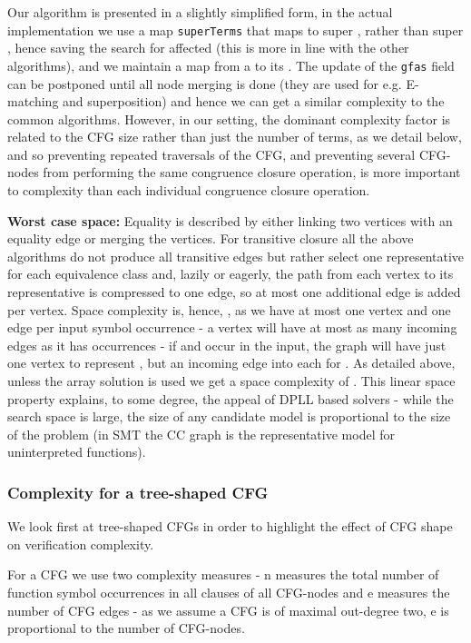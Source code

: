 Our algorithm is presented in a slightly simplified form, in the actual implementation we use a map \lstinline|superTerms| that maps to super \GFAs{}, rather than super \GTs{}, hence saving the search for affected \GFAs{} (this is more in line with the other algorithms), and we maintain a map from a \GFA{} to its \GT{}. The update of the \lstinline|gfas| field can be postponed until all node merging is done (they are used for e.g. E-matching and superposition) and hence we can get a similar complexity to the common algorithms. 
However, in our setting, the dominant complexity factor is related to the CFG size rather than just the number of terms, as we detail below, and so preventing repeated traversals of the CFG, and preventing several CFG-nodes from performing the same congruence closure operation, is more important to complexity than each individual congruence closure operation.

\textbf{Worst case space:} Equality is described by either linking two vertices with an equality edge or merging the vertices. For transitive closure all the above algorithms do not produce all transitive edges but rather select one representative for each equivalence class and, lazily or eagerly, the path from each vertex to its representative is compressed to one edge, so at most one additional edge is added per vertex.
Space complexity is, hence, , as we have at most one vertex and one edge per input symbol occurrence - a vertex will have at most as many incoming edges as it has occurrences - if  and  occur in the input, the graph will have just one vertex to represent , but an incoming edge into  each for .
As detailed above, unless the array solution is used we get a space complexity of .
This linear space property explains, to some degree, the appeal of DPLL based solvers - while the search space is large, 
the size of any candidate model is proportional to the size of the problem (in SMT the CC graph is the representative model for uninterpreted functions).

\subsubsection*{Complexity for a tree-shaped CFG}
We look first at tree-shaped CFGs in order to highlight the effect of CFG shape on verification complexity.

For a CFG we use two complexity measures - n measures the total number of function symbol occurrences in all clauses of all CFG-nodes and e measures the number of CFG edges - as we assume a CFG is of maximal out-degree two, e is proportional to the number of CFG-nodes.

